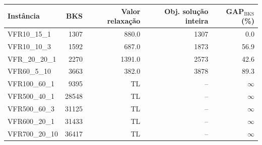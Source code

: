 \documentclass[12pt]{article}
\begin{document}
\begin{table}[ht]
   \begin{tabular}{lrrrr}
      \toprule
      Instância & BKS & Valor relaxação & Obj. solução inteira & GAP$_\mathrm{BKS}$ (\%) \\
      \midrule
      VFR10\_15\_1 & 1307 & 880.0 & 1307 & \phantom{0}0.0\\
      VFR10\_10\_3 & 1592 & 687.0 & 1873 & 56.9\\
      VFR\_20\_20\_1 & 2270 & 1391.0 & 2573 & 42.6\\
      VFR60\_5\_10 & 3663 & 382.0 & 3878 & 89.3\\
      VFR100\_60\_1 & 9395  &  TL & -- & $\infty$\\
      VFR500\_40\_1 & 28548 &  TL & -- & $\infty$\\
      VFR500\_60\_3 & 31125 &  TL & -- & $\infty$\\
      VFR600\_20\_1 & 31433 &  TL & -- & $\infty$\\
      VFR700\_20\_10 & 36417 & TL & -- & $\infty$\\ 
      \bottomrule
   \end{tabular}
\end{table}
\end{document}
